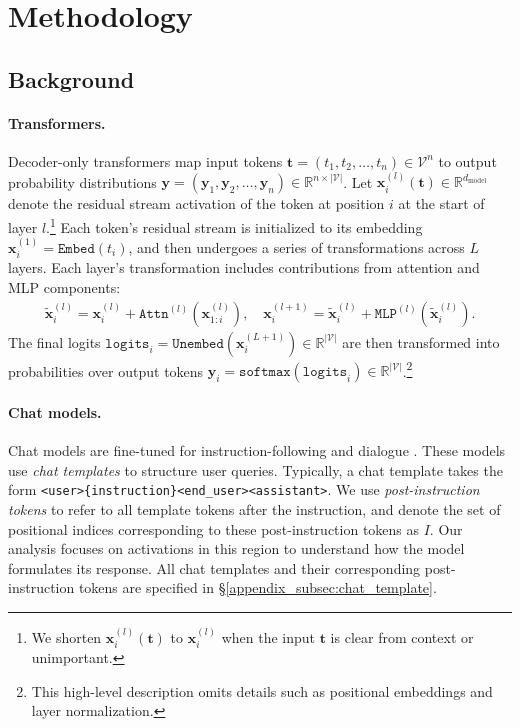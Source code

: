\documentclass{article}
\begin{document}
\section{Methodology}
\label{sec:methods}

\subsection{Background}
\label{subsec:background}

\paragraph{Transformers.}
Decoder-only transformers \citep{liu2018generating} map input tokens $\mathbf{t} = (t_1, t_2, \ldots, t_n) \in \mathcal{V}^n$ to output probability distributions $\mathbf{y} = (\mathbf{y}_1, \mathbf{y}_2, \ldots, \mathbf{y}_n) \in \mathbb{R}^{n \times |\mathcal{V}|}$. Let $\mathbf{x}_i^{(l)}(\mathbf{t}) \in \mathbb{R}^{d_{\text{model}}}$ denote the residual stream activation of the token at position $i$ at the start of layer $l$.\footnote{We shorten $\mathbf{x}_i^{(l)}(\mathbf{t})$ to $\mathbf{x}_i^{(l)}$ when the input $\mathbf{t}$ is clear from context or unimportant.} Each token's residual stream is initialized to its embedding $\mathbf{x}_i^{(1)} = \mathtt{Embed}(t_i)$, and then undergoes a series of transformations across $L$ layers. Each layer's transformation includes contributions from attention and MLP components:
\begin{align}
\tilde{\mathbf{x}}_i^{(l)} = \mathbf{x}_i^{(l)} + \mathtt{Attn}^{(l)}(\mathbf{x}_{1:i}^{(l)}), \quad \mathbf{x}_i^{(l+1)} = \tilde{\mathbf{x}}_i^{(l)} + \mathtt{MLP}^{(l)}(\tilde{\mathbf{x}}_i^{(l)}).
\end{align}
The final logits $\mathtt{logits}_i = \mathtt{Unembed}(\mathbf{x}_i^{(L+1)}) \in \mathbb{R}^{|\mathcal{V}|}$ are then transformed into probabilities over output tokens $\mathbf{y}_i = \mathtt{softmax}(\mathtt{logits}_i) \in \mathbb{R}^{|\mathcal{V}|}$.\footnote{This high-level description omits details such as positional embeddings and layer normalization.}

\paragraph{Chat models.}
Chat models are fine-tuned for instruction-following and dialogue \citep{ouyang2022training, touvron2023llama}.
These models use \emph{chat templates} to structure user queries.
Typically, a chat template takes the form \texttt{<user>\{instruction\}<end\_user><assistant>}.
We use \emph{post-instruction tokens} to refer to all template tokens after the instruction, and denote the set of positional indices corresponding to these post-instruction tokens as $I$.
Our analysis focuses on activations in this region to understand how the model formulates its response.
All chat templates and their corresponding post-instruction tokens are specified in \S\ref{appendix_subsec:chat_template}.
\end{document}

